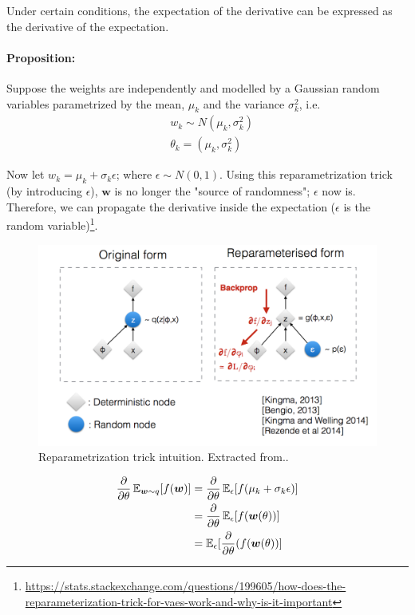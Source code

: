 \documentclass[main]{subfiles}
\begin{document}
\noindent Under certain conditions, the expectation of the derivative can be expressed as the derivative of the expectation.

\paragraph{Proposition:} Suppose the weights are independently and modelled by a Gaussian random variables parametrized by the mean, $\mu_k$ and the variance $\sigma^2_k$, i.e.
\begin{equation}
    \begin{split}
        & w_k \sim N(\mu_k,\sigma^2_k)\\
        & \theta_k = (\mu_k,\sigma^2_k)
    \end{split}
\end{equation}

\noindent Now let $w_k  = \mu_k + \sigma_k \epsilon$; where $\epsilon \sim N(0,1)$. Using this reparametrization trick (by introducing $\epsilon$), $\bm{w}$ is no longer the "source of randomness"; $\epsilon$ now is. Therefore, we can propagate the derivative inside the expectation ($\epsilon$ is the random variable)\footnote{\url{https://stats.stackexchange.com/questions/199605/how-does-the-reparameterization-trick-for-vaes-work-and-why-is-it-important}}.

\begin{figure}[H]
    	\centering
    	\includegraphics[width=0.9\linewidth]{05_LearningAsBayesianInference/figures/reparametrization.png}
    	\caption{Reparametrization trick intuition. Extracted from..} 
    	\label{fig:reparam_trick}
\end{figure}
    
\begin{equation}
    \begin{split}
        \frac{\partial}{\partial \theta} \operatorname{\mathbb{E}}_{\bm{w} \sim q} [f(\bm{w})] &= \frac{\partial}{\partial \theta} \operatorname{\mathbb{E}}_{\epsilon}[f(\mu_k + \sigma_k \epsilon)]\\
        &= \frac{\partial}{\partial \theta} \operatorname{\mathbb{E}}_{\epsilon} [f(\bm{w}(\theta))]\\
        &= \operatorname{\mathbb{E}}_{\epsilon}[\frac{\partial}{\partial \theta}(f(\bm{w}(\theta))]
    \end{split}
    \label{eq:reparametrization}
\end{equation}
\end{document}

